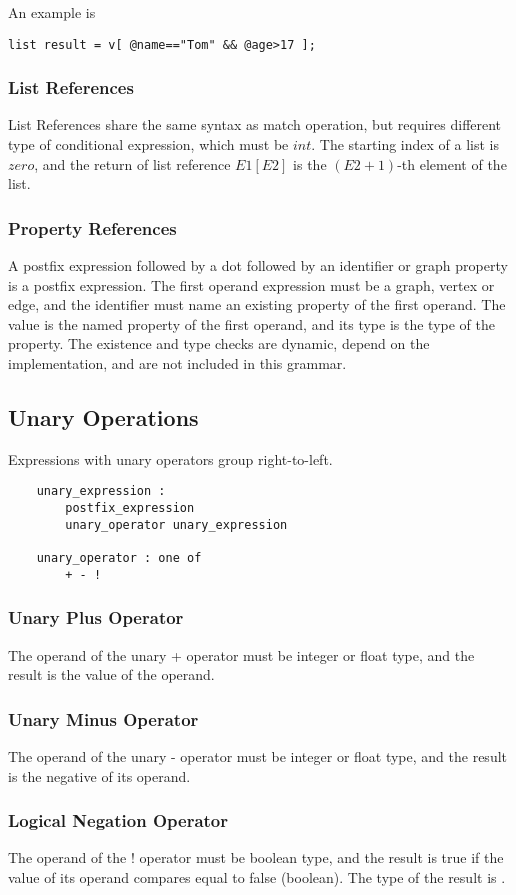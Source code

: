 \documentclass[letterpaper,12pt]{article}
\begin{document}
An example is
\begin{lstlisting}[frame=none]
	list result = v[ @name=="Tom" && @age>17 ];
\end{lstlisting}

\subsubsection{List References}
List References share the same syntax as match operation, but requires different type of conditional expression, which must be $int$. The starting index of a list is $zero$, and the return of list reference $E1[E2]$ is the $(E2+1)$-th element of the list.

\subsubsection{Property References}\label{sec:property_op}
A postfix expression followed by a dot followed by an identifier or graph property is a postfix expression. The first operand expression must be a graph, vertex or edge, and the identifier must name an existing property of the first operand. The value is the named property of the first operand, and its type is the type of the property. 
The existence and type checks are dynamic, depend on the implementation, and are not included in this grammar.

\subsection{Unary Operations}
Expressions with unary operators group right-to-left.
\begin{lstlisting}
	unary_expression :
    	postfix_expression
    	unary_operator unary_expression

	unary_operator : one of
		+ - !
\end{lstlisting}
\subsubsection{Unary Plus Operator}
The operand of the unary + operator must be integer or float type, and the result is the value of the operand. 
\subsubsection{Unary Minus Operator}
The operand of the unary - operator must be integer or float type, and the result is the negative of its operand. 
\subsubsection{Logical Negation Operator}
The operand of the ! operator must be boolean type, and the result is true if the value of its operand compares equal to false (boolean). The type of the result is {}.
\end{document}
